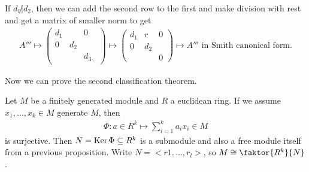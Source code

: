If $d_1 \not|d_2$, then we can add the second row to the first and make division with rest and get a matrix of smaller norm to get
\begin{align*}
	A''' \mapsto \begin{pmatrix}
	d_1 & & 0\\
	0 & d_2 & \\
		&  & {d_3}_{\ddots}
	\end{pmatrix} \mapsto \begin{pmatrix}
	d_1 & r & 0\\
	0 & d_2 & \\
	 &  & 0
	\end{pmatrix} \mapsto A''' \text{ in Smith canonical form.}
\end{align*}


Now we can prove the second classification theorem.

Let $M$ be a finitely generated module and $R$ a euclidean ring. If we assume $x_1, \ldots, x_k \in M$ generate $M$, then
\begin{align*}
	\Phi: a \in R^{k} \mapsto \sum_{i = 1}^{k}a_ix_i \in M
\end{align*}
is surjective. Then $N = \operatorname{Ker} \Phi \subseteq R^{k}$ is a submodule and also a free module itself from a previous proposition. Write $N = <r1,\ldots,r_l>$, so $M \iso \faktor{R^{k}}{N}$.

